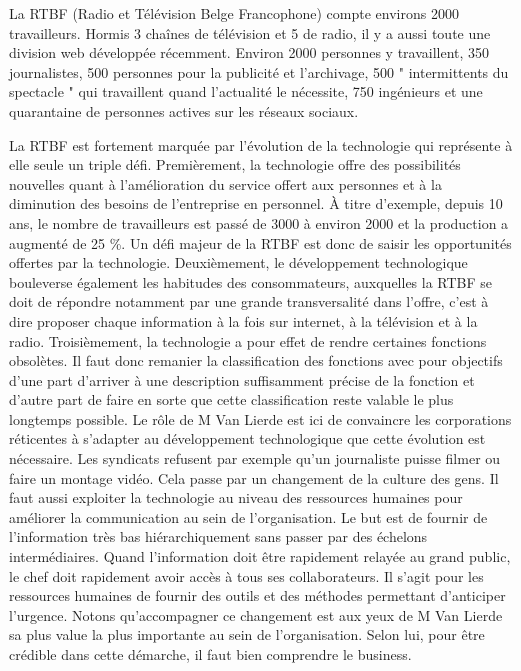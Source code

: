 \documentclass[a4paper, 12pt]{article}
\begin{document}
La RTBF (Radio et Télévision Belge Francophone) compte environs 2000 travailleurs. Hormis 3 chaînes de télévision et 5 de radio, il y a aussi toute une division web développée récemment. Environ 2000 personnes y travaillent, 350 journalistes, 500 personnes pour la publicité et l'archivage, 500 " intermittents du spectacle " qui travaillent quand l'actualité le nécessite, 750 ingénieurs et une quarantaine de personnes actives sur les réseaux sociaux.

La RTBF est fortement marquée par l'évolution de la technologie qui représente à elle seule un triple défi. Premièrement, la technologie offre des possibilités nouvelles quant à l'amélioration du service offert aux personnes et à la diminution des besoins de l'entreprise en personnel. À titre d'exemple, depuis 10 ans, le nombre de travailleurs est passé de 3000 à environ 2000 et la production a augmenté de 25 \%. Un défi majeur de la RTBF est donc de saisir les opportunités offertes par la technologie. Deuxièmement, le développement technologique bouleverse également les habitudes des consommateurs, auxquelles la RTBF se doit de répondre notamment par une grande transversalité dans l'offre, c'est à dire proposer chaque information à la fois sur internet, à la télévision et à la radio. Troisièmement, la technologie a pour effet de rendre certaines fonctions obsolètes. Il faut donc remanier la classification des fonctions avec pour objectifs d'une part d'arriver à une description suffisamment précise de la fonction et d'autre part de faire en sorte que cette classification reste valable le plus longtemps possible. Le rôle de M Van Lierde est ici de convaincre les corporations réticentes à s'adapter au développement technologique que cette évolution est nécessaire. Les syndicats refusent par exemple qu'un journaliste puisse filmer ou faire un montage vidéo. Cela passe par un changement de la culture des gens. Il faut aussi exploiter la technologie au niveau des ressources humaines pour améliorer la communication au sein de l'organisation. Le but est de fournir de l'information très bas hiérarchiquement sans passer par des échelons intermédiaires. Quand l'information doit être rapidement relayée au grand public, le chef doit rapidement avoir accès à tous ses collaborateurs. Il s'agit pour les ressources humaines de fournir des outils et des méthodes permettant d'anticiper l'urgence. Notons qu'accompagner ce changement est aux yeux de M Van Lierde sa plus value la plus importante au sein de l'organisation. Selon lui, pour être crédible dans cette démarche, il faut bien comprendre le business.
\end{document}
